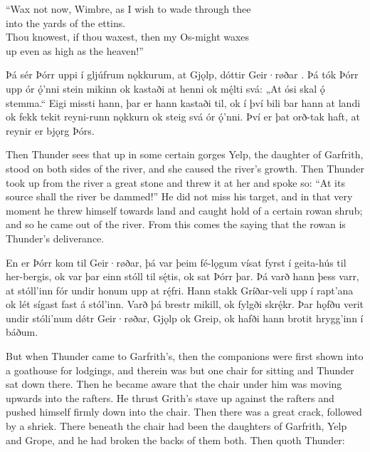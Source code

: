\bvb “Wax not now, Wimbre, as I wish to wade through thee \\
\ind into the yards of the ettins. \\
Thou knowest, if thou waxest, then my Os-might waxes \\
\ind up even as high as the heaven!”\evb\evg


\bpg\bpa[0]%
Þá sér Þórr uppi í gljúfrum nǫkkurum, at Gjǫlp, dóttir Geir·røðar .  Þá tók Þórr upp ór ǫ́’nni stein mikinn ok kastaði at henni ok mę́lti svá: „At ósi skal ǫ́ stemma.“  Eigi missti hann, þar er hann kastaði til, ok í því bili bar hann at landi ok fekk tekit reyni-runn nǫkkurn ok steig svá ór ǫ́’nni.  Því er þat orð-tak haft, at reynir er bjǫrg Þórs.\epa

\bpb Then Thunder sees that up in some certain gorges Yelp, the daughter of Garfrith, stood on both sides of the river, and she caused the river’s growth.  Then Thunder took up from the river a great stone and threw it at her and spoke so: “At its source shall the river be dammed!”  He did not miss his target, and in that very moment he threw himself towards land and caught hold of a certain rowan shrub; and so he came out of the river.  From this comes the saying that the rowan is Thunder’s deliverance.\epb\epg


\bpg\bpa[0]%
En er Þórr kom til Geir·røðar, þá var þeim fé-lǫgum vísat fyrst í geita-hús til her-bergis, ok var þar einn stóll til sę́tis, ok sat Þórr þar.  Þá varð hann þess varr, at stóll’inn fór undir honum upp at rę́fri.  Hann stakk Gríðar-veli upp í rapt’ana ok lét sígast fast á stól’inn.  Varð þá brestr mikill, ok fylgði skrę́kr.  Þar hǫfðu verit undir stóli’num dǿtr Geir·røðar, Gjǫlp ok Greip, ok hafði hann brotit hrygg’inn í báðum.  \epa

\bpb But when Thunder came to Garfrith’s, then the companions were first shown into a goathouse for lodgings, and therein was but one chair for sitting and Thunder sat down there.  Then he became aware that the chair under him was moving upwards into the rafters.  He thrust Grith’s stave up against the rafters and pushed himself firmly down into the chair.  Then there was a great crack, followed by a shriek.  There beneath the chair had been the daughters of Garfrith, Yelp and Grope, and he had broken the backs of them both.  Then quoth Thunder:\epb\epg


